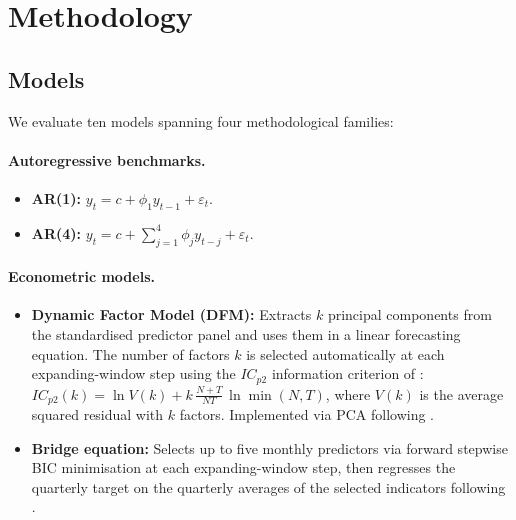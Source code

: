 \section{Methodology}
\label{sec:ch1_methodology}

\subsection{Models}

We evaluate ten models spanning four methodological families:

\paragraph{Autoregressive benchmarks.}
\begin{itemize}
  \item \textbf{AR(1):} $y_t = c + \phi_1 y_{t-1} + \varepsilon_t$.
  \item \textbf{AR(4):} $y_t = c + \sum_{j=1}^{4} \phi_j y_{t-j} + \varepsilon_t$.
\end{itemize}

\paragraph{Econometric models.}
\begin{itemize}
  \item \textbf{Dynamic Factor Model (DFM):} Extracts $k$ principal components from the standardised predictor panel and uses them in a linear forecasting equation.  The number of factors $k$ is selected automatically at each expanding-window step using the $IC_{p2}$ information criterion of \citet{bai2002determining}: $IC_{p2}(k) = \ln V(k) + k\,\frac{N+T}{NT}\,\ln\min(N,T)$, where $V(k)$ is the average squared residual with $k$ factors.  Implemented via PCA following \citet{stock2002macroeconomic}.
  \item \textbf{Bridge equation:} Selects up to five monthly predictors via forward stepwise BIC minimisation at each expanding-window step, then regresses the quarterly target on the quarterly averages of the selected indicators following \citet{baffigi2004bridge}.
\end{itemize}


